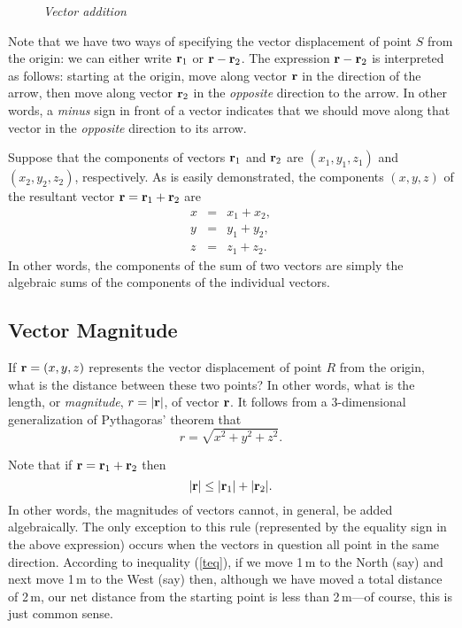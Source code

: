 \begin{figure}
\epsfysize=2in
\centerline{}
\caption{\em Vector addition}\label{f12}   
\end{figure}

Note that we have two ways of specifying the vector displacement of point $S$ from
the origin: we can either write ${\bf r}_1$ or ${\bf r} - {\bf r}_2$. The
expression ${\bf r} - {\bf r}_2$ is interpreted as follows: starting at the origin,
move along vector ${\bf r}$ in the direction of the arrow, then move along
vector ${\bf r}_2$ in the {\em opposite} direction to the arrow. In other words,
a {\em minus} sign in front of a vector indicates that we should move along that vector in
the {\em opposite} direction to its arrow. 

Suppose that the components of vectors ${\bf r}_1$ and ${\bf r}_2$ are
$(x_1, y_1, z_1)$ and $(x_2, y_2, z_2)$, respectively. As is easily demonstrated,
the components $(x,y,z)$ of the
resultant vector ${\bf r}= {\bf r}_1 + {\bf r}_2$ are 
\begin{eqnarray}
x &=& x_1+x_2,\\
y&=& y_1 + y_2,\\
z &=& z_1 + z_2.
\end{eqnarray}
In other words, the components of the sum of two vectors are simply the algebraic
sums of the components of the individual vectors. 

\subsection{Vector Magnitude}
If ${\bf r}=(x,y,z)$ represents  the vector displacement of point $R$ from the origin,
what is the distance between these two points? In other words, what is the length,
or {\em magnitude}, $r=|{\bf r}|$,
of vector ${\bf r}$. It follows from a 3-dimensional generalization  of
Pythagoras' theorem that
\begin{equation}\label{e36}
r = \sqrt{x^2+ y^2 + z^2}.
\end{equation}

Note that if ${\bf r} = {\bf r}_1 + {\bf r}_2$ then
\begin{equation}\label{teq}
|{\bf r}| \leq |{\bf r}_1| + 
|{\bf r}_2|.
\end{equation}
In other words, the magnitudes of  vectors cannot, in general, be added
algebraically. The only exception to this rule (represented by the equality sign in the
above expression) occurs when  the vectors in question all point in the same direction. 
According to inequality (\ref{teq}), if we move 1\,m to the North (say) and next move
1\,m to the West (say) then, although we have moved a total distance of 2\,m, our net distance
from the starting point is less than 2\,m---of course, this is just common sense.


